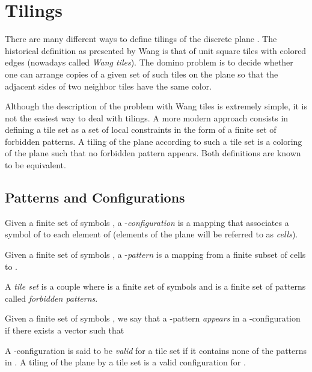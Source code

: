 \documentclass{jac}
\begin{document}
\section{Tilings} \label{sec:tilings}

There are many different ways to define tilings of the discrete plane . The historical definition as presented by Wang is that of unit square tiles with colored edges (nowadays called \emph{Wang tiles}). The domino problem is to decide whether one can arrange copies of a given set of such tiles on the plane so that the adjacent sides of two neighbor tiles have the same color.

Although the description of the problem with Wang tiles is extremely simple, it is not the easiest  way to deal with tilings. A more modern approach consists in defining a tile set as a set of local constraints in the form of a finite set of forbidden patterns. A tiling of the plane according to such a tile set is a coloring of the plane such that no forbidden pattern appears. Both definitions are known to be equivalent.

\subsection{Patterns and Configurations}

\begin{definition}[Configuration]\label{def:configuration}
	Given a finite set of symbols , a -\emph{configuration} is a mapping  that associates a symbol of  to each element of  (elements of the plane  will be referred to as \emph{cells}).
\end{definition}

\begin{definition}[Pattern]\label{def:pattern}
	Given a finite set of symbols , a -\emph{pattern} is a mapping  from a finite subset of cells  to .
\end{definition}

\begin{definition}\label{def:tile_set}
	A \emph{tile set} is a couple  where  is a finite set of symbols and  is a finite set of patterns called \emph{forbidden patterns}.
\end{definition}

\begin{definition}[Tilings]\label{def:valid}
	Given a finite set of symbols , we say that a -pattern  \emph{appears} in a -configuration  if there exists a vector  such that
	
	
	 A -configuration  is said to be \emph{valid} for a tile set  if it contains none of the patterns in . A tiling of the plane by a tile set  is a valid configuration for .
\end{definition}
\end{document}
